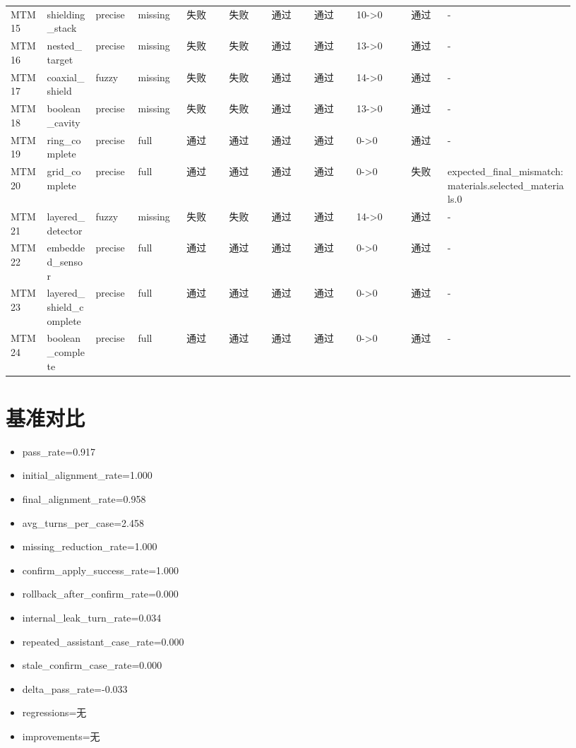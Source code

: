\documentclass[11pt]{ctexart}
\begin{document}
\begin{longtable}{p{0.06\linewidth}p{0.08\linewidth}p{0.07\linewidth}p{0.08\linewidth}p{0.07\linewidth}p{0.07\linewidth}p{0.07\linewidth}p{0.07\linewidth}p{0.09\linewidth}p{0.06\linewidth}p{0.21\linewidth}}
MTM15 & shielding\_stack & precise & missing & 失败 & 失败 & 通过 & 通过 & 10->0 & 通过 & - \\
MTM16 & nested\_target & precise & missing & 失败 & 失败 & 通过 & 通过 & 13->0 & 通过 & - \\
MTM17 & coaxial\_shield & fuzzy & missing & 失败 & 失败 & 通过 & 通过 & 14->0 & 通过 & - \\
MTM18 & boolean\_cavity & precise & missing & 失败 & 失败 & 通过 & 通过 & 13->0 & 通过 & - \\
MTM19 & ring\_complete & precise & full & 通过 & 通过 & 通过 & 通过 & 0->0 & 通过 & - \\
MTM20 & grid\_complete & precise & full & 通过 & 通过 & 通过 & 通过 & 0->0 & 失败 & expected\_final\_mismatch:materials.selected\_materials.0 \\
MTM21 & layered\_detector & fuzzy & missing & 失败 & 失败 & 通过 & 通过 & 14->0 & 通过 & - \\
MTM22 & embedded\_sensor & precise & full & 通过 & 通过 & 通过 & 通过 & 0->0 & 通过 & - \\
MTM23 & layered\_shield\_complete & precise & full & 通过 & 通过 & 通过 & 通过 & 0->0 & 通过 & - \\
MTM24 & boolean\_complete & precise & full & 通过 & 通过 & 通过 & 通过 & 0->0 & 通过 & - \\
\bottomrule
\end{longtable}
\section{基准对比}
\begin{itemize}
\item pass\_rate=0.917
\item initial\_alignment\_rate=1.000
\item final\_alignment\_rate=0.958
\item avg\_turns\_per\_case=2.458
\item missing\_reduction\_rate=1.000
\item confirm\_apply\_success\_rate=1.000
\item rollback\_after\_confirm\_rate=0.000
\item internal\_leak\_turn\_rate=0.034
\item repeated\_assistant\_case\_rate=0.000
\item stale\_confirm\_case\_rate=0.000
\item delta\_pass\_rate=-0.033
\item regressions=无
\item improvements=无
\end{itemize}
\appendix
\end{document}
